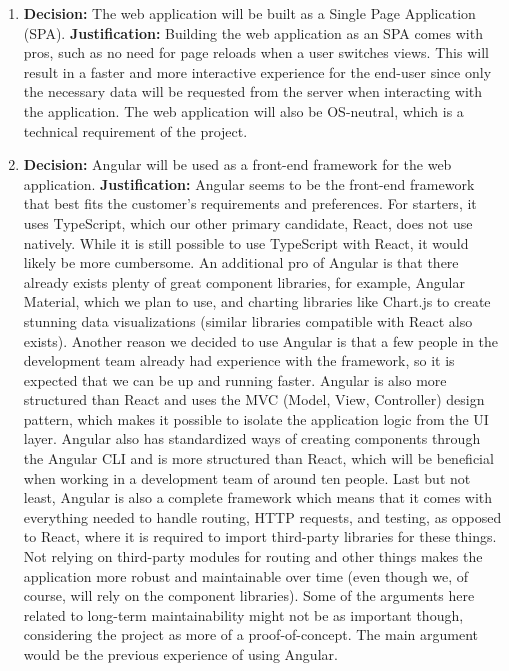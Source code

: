 \documentclass[10pt,a4paper]{article}
\begin{document}
\begin{enumerate}
    \item \textbf{Decision:} The web application will be built as a Single Page Application (SPA).
        \linebreak{}
        \textbf{Justification:} Building the web application as an SPA comes with pros, such as no need for page reloads when a user switches views. This will result in a faster and more interactive experience for the end-user since only the necessary data will be requested from the server when interacting with the application. The web application will also be OS-neutral, which is a technical requirement of the project.
        
    \item \textbf{Decision:} Angular will be used as a front-end framework for the web application.
    \linebreak{}
    \textbf{Justification:} Angular seems to be the front-end framework that best fits the customer's requirements and preferences. For starters, it uses TypeScript, which our other primary candidate, React, does not use natively. While it is still possible to use TypeScript with React, it would likely be more cumbersome. An additional pro of Angular is that there already exists plenty of great component libraries, for example, Angular Material, which we plan to use, and charting libraries like Chart.js to create stunning data visualizations (similar libraries compatible with React also exists). Another reason we decided to use Angular is that a few people in the development team already had experience with the framework, so it is expected that we can be up and running faster. Angular is also more structured than React and uses the MVC (Model, View, Controller) design pattern, which makes it possible to isolate the application logic from the UI layer.
    Angular also has standardized ways of creating components through the Angular CLI and is more structured than React, which will be beneficial when working in a development team of around ten people. Last but not least, Angular is also a complete framework which means that it comes with everything needed to handle routing, HTTP requests, and testing, as opposed to React, where it is required to import third-party libraries for these things. Not relying on third-party modules for routing and other things makes the application more robust and maintainable over time (even though we, of course, will rely on the component libraries). Some of the arguments here related to long-term maintainability might not be as important though, considering the project as more of a proof-of-concept. The main argument would be the previous experience of using Angular.
    

\end{enumerate}
\end{document}
